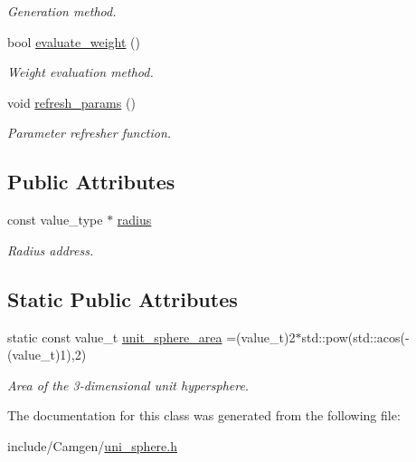 \begin{DoxyCompactItemize}
\begin{DoxyCompactList}\small\item\em Generation method. \end{DoxyCompactList}\item 
\hypertarget{a00552_a0a21ab6d09dc949a36aeeeeebc83b781}{bool \hyperlink{a00552_a0a21ab6d09dc949a36aeeeeebc83b781}{evaluate\-\_\-weight} ()}\label{a00552_a0a21ab6d09dc949a36aeeeeebc83b781}

\begin{DoxyCompactList}\small\item\em Weight evaluation method. \end{DoxyCompactList}\item 
\hypertarget{a00552_a5dff10eb86ad281e5eee4a320f2f35a6}{void \hyperlink{a00552_a5dff10eb86ad281e5eee4a320f2f35a6}{refresh\-\_\-params} ()}\label{a00552_a5dff10eb86ad281e5eee4a320f2f35a6}

\begin{DoxyCompactList}\small\item\em Parameter refresher function. \end{DoxyCompactList}\end{DoxyCompactItemize}
\subsection*{Public Attributes}
\begin{DoxyCompactItemize}
\item 
\hypertarget{a00552_a5766eb62eabb613cae60461dd26caef5}{const value\-\_\-type $\ast$ \hyperlink{a00552_a5766eb62eabb613cae60461dd26caef5}{radius}}\label{a00552_a5766eb62eabb613cae60461dd26caef5}

\begin{DoxyCompactList}\small\item\em Radius address. \end{DoxyCompactList}\end{DoxyCompactItemize}
\subsection*{Static Public Attributes}
\begin{DoxyCompactItemize}
\item 
\hypertarget{a00552_a934f2a9ea8394e592aa3f97011cd234d}{static const value\-\_\-t \hyperlink{a00552_a934f2a9ea8394e592aa3f97011cd234d}{unit\-\_\-sphere\-\_\-area} =(value\-\_\-t)2$\ast$std\-::pow(std\-::acos(-\/(value\-\_\-t)1),2)}\label{a00552_a934f2a9ea8394e592aa3f97011cd234d}

\begin{DoxyCompactList}\small\item\em Area of the 3-\/dimensional unit hypersphere. \end{DoxyCompactList}\end{DoxyCompactItemize}


The documentation for this class was generated from the following file\-:\begin{DoxyCompactItemize}
\item 
include/\-Camgen/\hyperlink{a00797}{uni\-\_\-sphere.\-h}\end{DoxyCompactItemize}
